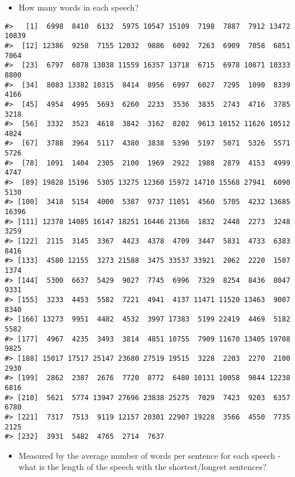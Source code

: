 \documentclass[]{book}
\newenvironment{Shaded}{\begin{snugshade}}{\end{snugshade}}
\newcommand{\KeywordTok}[1]{\textcolor[rgb]{0.13,0.29,0.53}{\textbf{#1}}}
\newcommand{\NormalTok}[1]{#1}
\newcommand{\OperatorTok}[1]{\textcolor[rgb]{0.81,0.36,0.00}{\textbf{#1}}}
\newcommand{\StringTok}[1]{\textcolor[rgb]{0.31,0.60,0.02}{#1}}
\providecommand{\tightlist}{%
  \setlength{\itemsep}{0pt}\setlength{\parskip}{0pt}}
\begin{document}
\begin{itemize}
\tightlist
\item
  How many words in each speech?
\end{itemize}

\begin{Shaded}
\end{Shaded}

\begin{verbatim}
#>   [1]  6998  8410  6132  5975 10547 15109  7198  7887  7912 13472 10839
#>  [12] 12386  9258  7155 12032  9886  6092  7263  6909  7058  6851  7064
#>  [23]  6797  6078 13038 11559 16357 13718  6715  6978 10871 10333  8800
#>  [34]  8083 13382 10315  8414  8956  6997  6027  7295  1090  8339  4166
#>  [45]  4954  4995  5693  6260  2233  3536  3835  2743  4716  3785  3218
#>  [56]  3332  3523  4618  3842  3162  8202  9613 10152 11626 10512  4824
#>  [67]  3788  3964  5117  4380  3838  5390  5197  5071  5326  5571  5726
#>  [78]  1091  1404  2305  2100  1969  2922  1988  2879  4153  4999  4747
#>  [89] 19828 15196  5305 13275 12360 15972 14710 15568 27941  6090  5130
#> [100]  3418  5154  4000  5387  9737 11051  4560  5705  4232 13685 16396
#> [111] 12378 14085 16147 18251 16446 21366  1832  2448  2273  3248  3259
#> [122]  2115  3145  3367  4423  4378  4709  3447  5831  4733  6383  8416
#> [133]  4580 12155  3273 21588  3475 33537 33921  2062  2220  1507  1374
#> [144]  5300  6637  5429  9027  7745  6996  7329  8254  8436  8047  9331
#> [155]  3233  4453  5582  7221  4941  4137 11471 11520 13463  9007  8340
#> [166] 13273  9951  4482  4532  3997 17383  5199 22419  4469  5182  5582
#> [177]  4967  4235  3493  3814  4851 10755  7909 11670 13405 19708  9825
#> [188] 15017 17517 25147 23680 27519 19515  3228  2203  2270  2100  2930
#> [199]  2862  2387  2676  7720  8772  6480 10131 10058  9844 12238  6816
#> [210]  5621  5774 13947 27696 23838 25275  7029  7423  9203  6357  6780
#> [221]  7317  7513  9119 12157 20301 22907 19228  3566  4550  7735  2125
#> [232]  3931  5482  4765  2714  7637
\end{verbatim}

\begin{itemize}
\tightlist
\item
  Measured by the average number of words per sentence for each speech - what is the length of the speech with the shortest/longest sentences?
\end{itemize}
\end{document}
